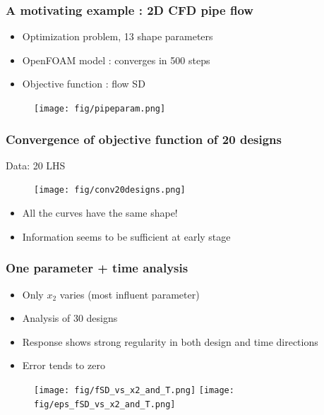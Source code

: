 \documentclass[10pt]{beamer}
\begin{document}
\frame
{
\frametitle{A motivating example : 2D CFD pipe flow}
\begin{itemize}
 \item Optimization problem, 13 shape parameters
 \item OpenFOAM model : converges in 500 steps
 \item Objective function : flow SD
\end{itemize}

\vspace{-1cm}
\begin{figure}[h!]
	\centering
	\hspace{1cm} \texttt{[image: fig/pipeparam.png]}
\end{figure}
}
\frame
{
\frametitle{Convergence of objective function of 20 designs}
Data: 20 LHS
\begin{figure}[htbp]
	\centering
		\texttt{[image: fig/conv20designs.png]}
\end{figure}
\vspace{-5mm}
\begin{itemize}
 \item All the curves have the same shape!
 \item Information seems to be sufficient at early stage
\end{itemize}
}
\frame
{
\frametitle{One parameter + time analysis}
\begin{itemize}
 \item Only $x_2$ varies (most influent parameter)
 \item Analysis of 30 designs
 \item Response shows strong regularity in both design and time directions
 \item Error tends to zero
\end{itemize}
\vspace{-5mm}
\begin{figure}[h!]
	\centering
	\hspace{-1.2cm}	\texttt{[image: fig/fSD\_vs\_x2\_and\_T.png]}
	            	\texttt{[image: fig/eps\_fSD\_vs\_x2\_and\_T.png]}
\end{figure}
}
\end{document}
